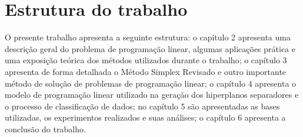 \section{Estrutura do trabalho}
O presente trabalho apresenta a seguinte estrutura: o capítulo 2 apresenta uma descrição geral do problema de programação linear, algumas aplicações prática e uma exposição teórica dos métodos utilizados durante o trabalho; o capítulo 3 apresenta de forma detalhada o Método Simplex Revisado e outro importante método de solução de problemas de programação linear; o capítulo 4 apresenta o modelo de programação linear utilizado na geração dos hiperplanos separadores e o processo de classificação de dados; no capítulo 5 são apresentadas as bases utilizadas, os experimentos realizados e suas análises; o capítulo 6 apresenta a conclusão do trabalho. 
